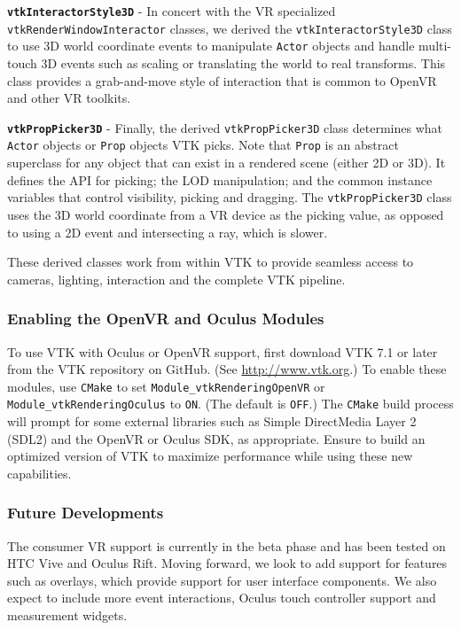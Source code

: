 \textbf{\texttt{vtkInteractorStyle3D}} - In concert with the VR specialized \texttt{vtkRenderWindowInteractor} classes, we derived the \texttt{vtkInteractorStyle3D} class
to use 3D world coordinate events to manipulate \texttt{Actor} objects and handle multi-touch 3D events such as scaling or translating the world to real transforms.
This class provides a grab-and-move style of interaction that is common to OpenVR and other VR toolkits.

\textbf{\texttt{vtkPropPicker3D}} - Finally, the derived \texttt{vtkPropPicker3D} class determines what \texttt{Actor} objects or \texttt{Prop} objects VTK picks.
Note that \texttt{Prop} is an abstract superclass for any object that can exist in a rendered scene (either 2D or 3D). It defines the API for picking; the LOD manipulation; and the common instance variables that control visibility, picking and dragging.
The \texttt{vtkPropPicker3D} class uses the 3D world coordinate from a VR device as the picking value, as opposed to using a 2D event and intersecting a ray, which is slower.

These derived classes work from within VTK to provide seamless access to cameras, lighting, interaction and the complete VTK pipeline.

\subsubsection{Enabling the OpenVR and Oculus Modules}

To use VTK with Oculus or OpenVR support, first download VTK 7.1 or later from the VTK
repository on GitHub. (See \url{http://www.vtk.org}.)
To enable these modules, use \texttt{CMake} to set \texttt{Module\_vtkRenderingOpenVR} or \texttt{Module\_vtkRenderingOculus} to \texttt{ON}. (The default is \texttt{OFF}.)
The \texttt{CMake} build process will prompt for some external libraries such as Simple DirectMedia Layer 2 (SDL2) and the OpenVR or Oculus SDK, as appropriate.
Ensure to build an optimized version of VTK to maximize performance while using these new capabilities.

\subsubsection{Future Developments}

The consumer VR support is currently in the beta phase and has been tested on HTC Vive and Oculus Rift. Moving forward, we look to add support for features such as overlays, which provide support for user interface components. We also expect to include more event interactions, Oculus touch controller support and measurement widgets.

